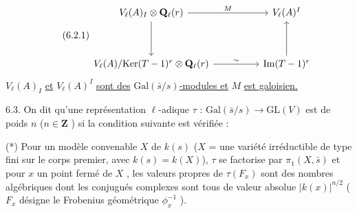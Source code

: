 \begin{equation}\tag{6.2.1}
\begin{tikzcd}[column sep=huge, row sep=huge]
V_{\ell}(A)_{I} \otimes \mathbf{Q}_{\ell}(r) \arrow[r, "M"] \arrow[d] & V_{\ell}(A)^{I} \\
V_{\ell}(A)/\mathrm{Ker}(T-1)^{r} \otimes \mathbf{Q}_{\ell}(r) \arrow[r, "\sim"] & \mathrm{Im}(T-1)^{r} \arrow[u]
\end{tikzcd}
\end{equation}
$V_{\ell}(A)_{I}$ \underline{et} $V_{\ell}(A)^{I}$ \underline{sont des} $\mathrm{Gal}(\bar{s}/s)$\underline{-modules et} $M$ \underline{est galoisien.}

6.3. On dit qu'une représentation $\ell$-adique $\tau$ : $\mathrm{Gal}(\bar{s}/s) \longrightarrow \mathrm{GL}(V)$ est de poids $n$ ($n \in \mathbf{Z}$ ) si la condition suivante est vérifiée :

(*) Pour un modèle convenable $X$ de $k(s)$ ($X$ = une variété irréductible de type fini sur le corps premier, avec $k(s) = k(X)$), $\tau$ se factorise par $\pi_{1}(X,\bar{s})$ et pour $x$ un point fermé de $X$ , les valeurs propres de $\tau(F_{x})$ sont des nombres algébriques dont les conjugués complexes sont tous de valeur absolue $|k(x)|^{n/2}$ ($F_{x}$ désigne le Frobenius géométrique $\phi_{x}^{-1}$ ).


